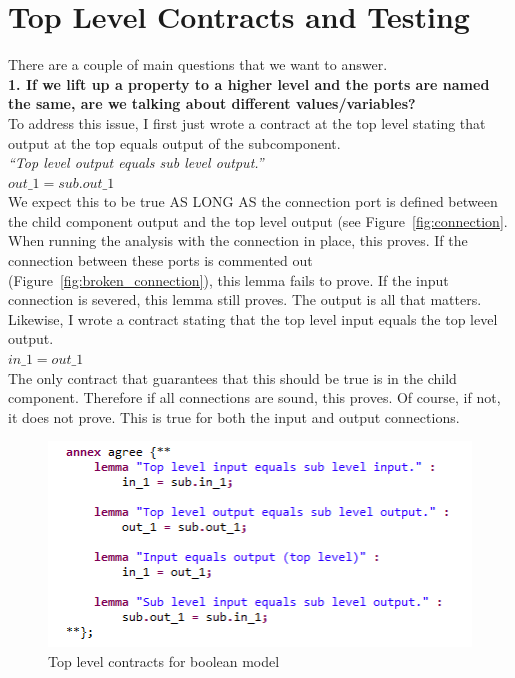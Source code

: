 \documentclass{article}
\begin{document}
\section{Top Level Contracts and Testing}

There are a couple of main questions that we want to answer. \\

\textbf{1. If we lift up a property to a higher level and the ports are named the same, are we talking about different values/variables?}\\

To address this issue, I first just wrote a contract at the top level stating that output at the top equals output of the subcomponent. \\

\textit{``Top level output equals sub level output.''}\\
$out\_1 = sub.out\_1$\\

We expect this to be true AS LONG AS the connection port is defined between the child component output and the top level output (see Figure~\ref{fig:connection}. When running the analysis with the connection in place, this proves. If the connection between these ports is commented out (Figure~\ref{fig:broken_connection}), this lemma fails to prove. If the input connection is severed, this lemma still proves. The output is all that matters.\\

Likewise, I wrote a contract stating that the top level input equals the top level output.\\
$in\_1 = out\_1$\\

The only contract that guarantees that this should be true is in the child component. Therefore if all connections are sound, this proves. Of course, if not, it does not prove. This is true for both the input and output connections.\\

\begin{figure}[h]
\begin{center}
\includegraphics[width=1.2\textwidth]{images/lemmas} 
\caption{Top level contracts for boolean model}
\label{fig:lemmas}
\end{center}
\end{figure}
\end{document}
